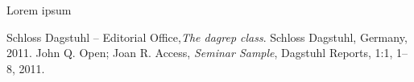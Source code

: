 \license

Lorem ipsum

\begin{thebibliography}{0}
 Schloss Dagstuhl -- Editorial Office,\textsl{The dagrep class}. Schloss Dagstuhl, Germany, 2011.
 John Q. Open; Joan R. Access, \textsl{Seminar Sample}, Dagstuhl Reports, 1:1, 1--8, 2011.
\end{thebibliography}

